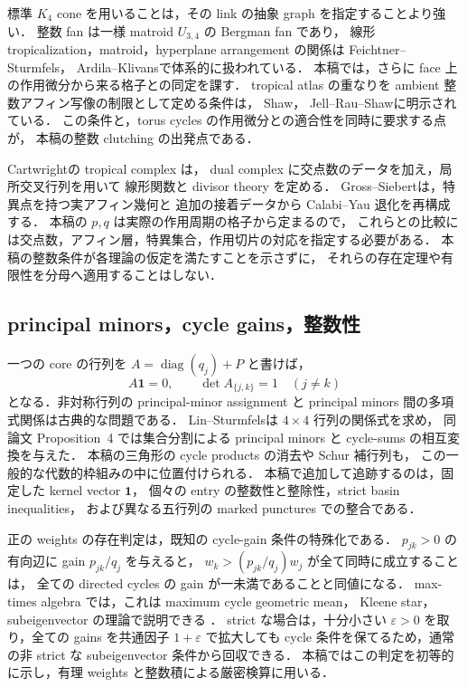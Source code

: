標準 $K_4$ cone を用いることは，その link の抽象 graph を指定することより強い．
整数 fan は一様 matroid $U_{3,4}$ の Bergman fan であり，
線形 tropicalization，matroid，hyperplane arrangement の関係は
Feichtner--Sturmfels\cite{FeichtnerSturmfels}，
Ardila--Klivans\cite{ArdilaKlivans}で体系的に扱われている．
本稿では，さらに face 上の作用微分から来る格子との同定を課す．
tropical atlas の重なりを ambient 整数アフィン写像の制限として定める条件は，
Shaw\cite[Definition~3.1]{ShawSurfaces}，
Jell--Rau--Shaw\cite[Definitions~2.1 and~5.1]{JellRauShaw}に明示されている．
この条件と，torus cycles の作用微分との適合性を同時に要求する点が，
本稿の整数 clutching の出発点である．

Cartwright\cite[Definitions~2.5 and~2.8]{CartwrightComplexes}の tropical complex は，
dual complex に交点数のデータを加え，局所交叉行列を用いて
線形関数と divisor theory を定める．
Gross--Siebert\cite{GrossSiebert}は，特異点を持つ実アフィン幾何と
追加の接着データから Calabi--Yau 退化を再構成する．
本稿の $p,q$ は実際の作用周期の格子から定まるので，
これらとの比較には交点数，アフィン層，特異集合，作用切片の対応を指定する必要がある．
本稿の整数条件が各理論の仮定を満たすことを示さずに，
それらの存在定理や有限性を分母へ適用することはしない．

\subsection{principal minors，cycle gains，整数性}

一つの core の行列を $A=\operatorname{diag}(q_j)+P$ と書けば，
\[
 A\mathbf1=0,\qquad \det A_{\{j,k\}}=1\quad(j\ne k)
\]
となる．非対称行列の principal-minor assignment と
principal minors 間の多項式関係は古典的な問題である．
Lin--Sturmfels\cite{LinSturmfels}は $4\times4$ 行列の関係式を求め，
同論文 Proposition~4 では集合分割による principal minors と cycle-sums の相互変換を与えた．
本稿の三角形の cycle products の消去や Schur 補行列も，
この一般的な代数的枠組みの中に位置付けられる．
本稿で追加して追跡するのは，固定した kernel vector $\mathbf1$，
個々の entry の整数性と整除性，strict basin inequalities，
および異なる五行列の marked punctures での整合である．

正の weights の存在判定は，既知の cycle-gain 条件の特殊化である．
$p_{jk}>0$ の有向辺に gain $p_{jk}/q_j$ を与えると，
$w_k>(p_{jk}/q_j)w_j$ が全て同時に成立することは，
全ての directed cycles の gain が一未満であることと同値になる．
max-times algebra では，これは maximum cycle geometric mean，
Kleene star，subeigenvector の理論で説明できる
\cite[\S2, Theorem~2.2 and Proposition~2.5]{SergeevSchneiderButkovic}．
strict な場合は，十分小さい $\varepsilon>0$ を取り，全ての gains を共通因子 $1+\varepsilon$ で拡大しても
cycle 条件を保てるため，通常の非 strict な subeigenvector 条件から回収できる．
本稿ではこの判定を初等的に示し，有理 weights と整数積による厳密検算に用いる．


